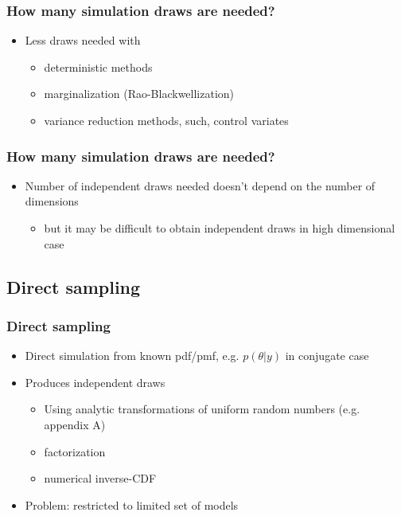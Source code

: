 \documentclass[10pt]{beamer}
\begin{document}
\begin{frame}

\frametitle{How many simulation draws are needed?}

  \begin{itemize}
  \item Less draws needed with
    \begin{itemize}
    \item deterministic methods
    \item marginalization (Rao-Blackwellization)
    \item variance reduction methods, such, control variates
    \end{itemize}
  \end{itemize}

\end{frame}

\begin{frame}

\frametitle{How many simulation draws are needed?}

  \begin{itemize}
  \item Number of independent draws needed doesn't depend on the number of dimensions
    \begin{itemize}
    \item but it may be difficult to obtain independent draws in high dimensional case
    \end{itemize}
  \end{itemize}

\end{frame}

\begin{frame}

\section{Direct sampling}

\frametitle{Direct sampling}

  \begin{itemize}
  \item Direct simulation from known pdf/pmf, e.g. $p(\theta|y)$ in conjugate case
  \item Produces independent draws
    \begin{itemize}
    \item Using analytic transformations of uniform random numbers
      (e.g. appendix A)
    \item factorization
    \item numerical inverse-CDF
    \end{itemize}
  \item {\color{uured} Problem}: restricted to limited set of models
  \end{itemize}

\end{frame}
\end{document}

